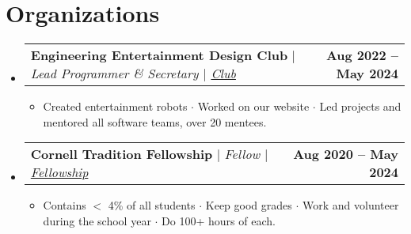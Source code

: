 \documentclass[letterpaper,11pt]{article}
\makeatletter
\newcommand{\resumeItem}[1]{
  \item\small{
    {#1 \vspace{-2pt}}
  }
}
\newcommand{\resumeProjectHeading}[2]{
    \item
    \begin{tabular*}{1.001\textwidth}{l@{\extracolsep{\fill}}r}
      \small#1 & \textbf{\small #2}\\
    \end{tabular*}\vspace{-7pt}
}
\newcommand{\resumeSubHeadingListStart}{\begin{itemize}[leftmargin=0.0in, label={}]}
\newcommand{\resumeSubHeadingListEnd}{\end{itemize}}
\newcommand{\resumeItemListStart}{\begin{itemize}}
\newcommand{\resumeItemListEnd}{\end{itemize}\vspace{-5pt}}
\makeatother
\begin{document}
\section{\textcolor{customred}{Organizations}}
    \vspace{-6pt}
    \resumeSubHeadingListStart
    \resumeProjectHeading
          {\textbf{Engineering Entertainment Design Club} $|$ \emph{Lead Programmer \& Secretary  $|$
          \href{https://www.linkedin.com/company/cornell-entertainment-engineering-and-design-club/}{Club}}}{Aug 2022 -- May 2024}
          \resumeItemListStart
            \resumeItem{Created entertainment robots $\cdot$ Worked on our website
            $\cdot$ Led projects and mentored all software teams, over 20 mentees.}
          \resumeItemListEnd
          \vspace{-14pt}
    \resumeProjectHeading
          {\textbf{Cornell Tradition Fellowship} $|$ \emph{Fellow $|$
          \href{https://scl.cornell.edu/get-involved/cornell-commitment/cornell-tradition}{Fellowship}
          }}{Aug 2020 -- May 2024}
          \resumeItemListStart
            \resumeItem{Contains $<$ 4\% of all students $\cdot$ Keep good grades
             $\cdot$ Work and volunteer during the school year $\cdot$ Do 100+ hours of each.}
          \resumeItemListEnd
          \vspace{-14pt}
    \resumeSubHeadingListEnd
\vspace{-3pt}
\end{document}
